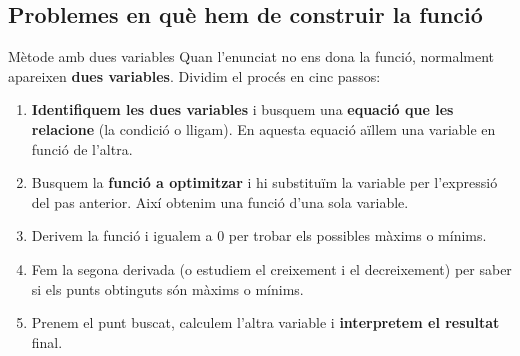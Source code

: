 \documentclass[11pt,a4paper]{article}
\makeatletter
\newcommand{\fmm}[1]{\setbox0=\hbox{$#1$}\ifdim\wd0>0.8\linewidth\def\fmmnext{\fmmdisp{#1}}\else\def\fmmnext{\mbox{\box0}}\fi\fmmnext}
\def\fmmdisp#1{\@ifnextchar.{\fmmdispp{#1}}{\@ifnextchar,{\fmmdispc{#1}}{\@ifnextchar;{\fmmdisps{#1}}{\fmdisp{#1}}}}}
\def\fmmdispp#1.{\fmdisp{#1\,.}}\def\fmmdispc#1,{\fmdisp{#1\,,}}\def\fmmdisps#1;{\fmdisp{#1\,;}}
\newcommand{\fmdisp}[1]{\[\setbox2=\hbox{$\displaystyle #1$}\ifdim\wd2>\linewidth\resizebox{\linewidth}{!}{\box2}\else\box2\fi\]}
\newcommand{\fmuline}[1]{\textbf{\color{fmaccent}#1}}
\makeatother
\begin{document}
\Needspace{5.1cm}
\subsection*{Problemes en què hem de construir la funció}
\begin{fmdef}{Mètode amb dues variables}
Quan l'enunciat no ens dona la funció, normalment apareixen \textbf{dues variables}. Dividim el procés en cinc passos:

\begin{enumerate}
\item \textbf{Identifiquem les dues variables} i busquem una \textbf{equació que les relacione} (la condició o lligam). En aquesta equació aïllem una variable en funció de l'altra.
\item Busquem la \textbf{funció a optimitzar} i hi substituïm la variable per l'expressió del pas anterior. Així obtenim una funció d'una sola variable.
\item Derivem la funció i igualem a 0 per trobar els possibles màxims o mínims.
\item Fem la segona derivada (o estudiem el creixement i el decreixement) per saber si els punts obtinguts són màxims o mínims.
\item Prenem el punt buscat, calculem l'altra variable i \textbf{interpretem el resultat} final.
\end{enumerate}

\end{fmdef}
\end{document}
